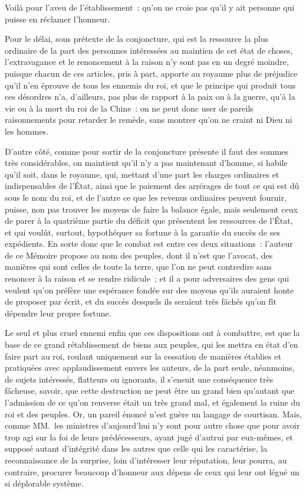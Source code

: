 \documentclass[french,twoside]{book} %
\begin{document}
Voilà pour l’aveu de l’établissement : qu’on ne croie pas qu’il y ait personne qui puisse en réclamer l’honneur.\par
Pour le délai, sous prétexte de la conjoncture, qui est la ressource la plus ordinaire de la part des personnes intéressées au maintien de cet état de choses, l’extravagance et le renoncement à la raison n’y sont pas en un degré moindre, puisque chacun de ces articles, pris à part, apporte au royaume plus de préjudice qu’il n’en éprouve de tous les ennemis du roi, et que le principe qui produit tous ces désordres n’a, d’ailleurs, pas plus de rapport à la paix ou à la guerre, qu’à la vie ou à la mort du roi de la Chine : on ne peut donc user de pareils raisonnements pour retarder le remède, sans montrer qu’on ne craint ni Dieu ni les hommes.\par
D’autre côté, comme pour sortir de la conjoncture présente il faut des sommes très considérables, on maintient qu’il n’y a pas maintenant d’homme, si habile qu’il soit, dans le royaume, qui, mettant d’une part les charges ordinaires et indispensables de l’État, ainsi que le paiement des arrérages de tout ce qui est dû sous le nom du roi, et de l’autre ce que les revenus ordinaires peuvent fournir, puisse, non pas trouver les moyens de faire la balance égale, mais seulement ceux de parer à la quatrième partie du déficit que présentent les ressources de l’État, et qui voulût, surtout, hypothéquer sa fortune à la garantie du succès de ses expédients. En sorte donc que le combat est entre ces deux situations : l’auteur de ce Mémoire propose au nom des peuples, dont il n’est que l’avocat, des manières qui sont celles de toute la terre, que l’on ne peut contredire sans renoncer à la raison et se rendre ridicule ; et il a pour adversaires des gens qui veulent qu’on préfère une espérance fondée sur des moyens qu’ils auraient honte de proposer par écrit, et du succès desquels ils seraient très fâchés qu’on fît dépendre leur propre fortune.\par
Le seul et plus cruel ennemi enfin que ces dispositions ont à combattre, est que la base de ce grand rétablissement de biens aux peuples, qui les mettra en état d’en faire part au roi, roulant uniquement sur la cessation de manières établies et pratiquées avec applaudissement envers les auteurs, de la part seule, néanmoins, de sujets intéressés, flatteurs ou ignorants, il s’ensuit une conséquence très fâcheuse, savoir, que cette destruction ne peut être un grand bien qu’autant que l’admission de ce qu’on renverse était un très grand mal, et également la ruine du roi et des peuples. Or, un pareil énoncé n’est guère un langage de courtisan. Mais, comme MM. les ministres d’aujourd’hui n’y sont pour autre chose que pour avoir trop agi sur la foi de leurs prédécesseurs, ayant jugé d’autrui par eux-mêmes, et supposé autant d’intégrité dans les autres que celle qui les caractérise, la reconnaissance de la surprise, loin d’intéresser leur réputation, leur pourra, au contraire, procurer beaucoup d’honneur aux dépens de ceux qui leur ont légué un si déplorable système.\par
\end{document}

